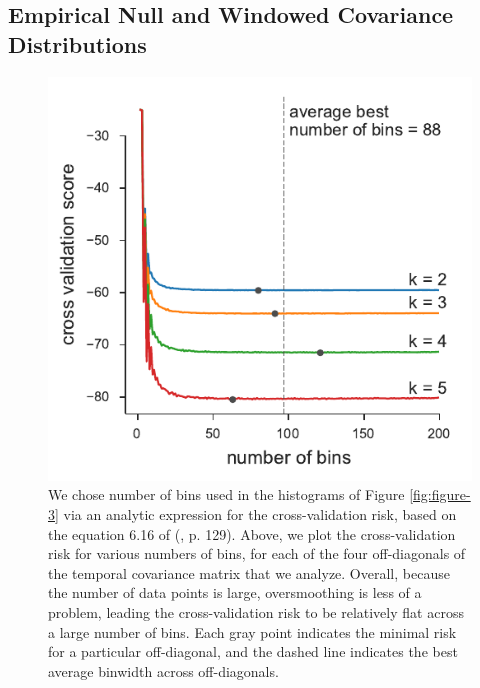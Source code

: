 \documentclass[11pt]{article}
\begin{document}
{\begin{figure}[!ht]
  \label{suppfig:barghi-trimmed-mean}
\end{figure}



\clearpage

\subsection{\textcite{Barghi2019-qy} Empirical Null and Windowed Covariance Distributions}

\begin{figure}[!ht]
  \centering
  \includegraphics[]{figures/barghi-cross-validation-binsize.pdf}

  \caption{We chose number of bins used in the histograms of Figure
    \ref{fig:figure-3} via an analytic expression for the cross-validation
    risk, based on the equation 6.16 of (\cite{Wasserman2006-jl}, p. 129).
    Above, we plot the cross-validation risk for various numbers of bins, for
    each of the four off-diagonals of the temporal covariance matrix that we
    analyze. Overall, because the number of data points is large, oversmoothing
    is less of a problem, leading the cross-validation risk to be relatively
    flat across a large number of bins. Each gray point indicates the minimal
    risk for a particular off-diagonal, and the dashed line indicates the best
    average binwidth across off-diagonals.}
  \label{suppfig:barghi-cross-validation-binsize}
\end{figure}



}
\end{document}
